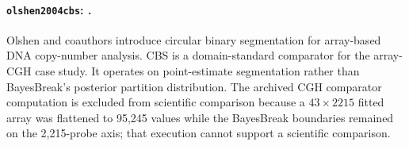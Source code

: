 
\paragraph{\texttt{olshen2004cbs}: \citet{olshen2004cbs}.}
Olshen and coauthors introduce circular binary segmentation for array-based DNA copy-number analysis. CBS is a domain-standard comparator for the array-CGH case study. It operates on point-estimate segmentation rather than BayesBreak's posterior partition distribution. The archived CGH comparator computation is excluded from scientific comparison because a $43\times2215$ fitted array was flattened to 95,245 values while the BayesBreak boundaries remained on the 2,215-probe axis; that execution cannot support a scientific comparison.
